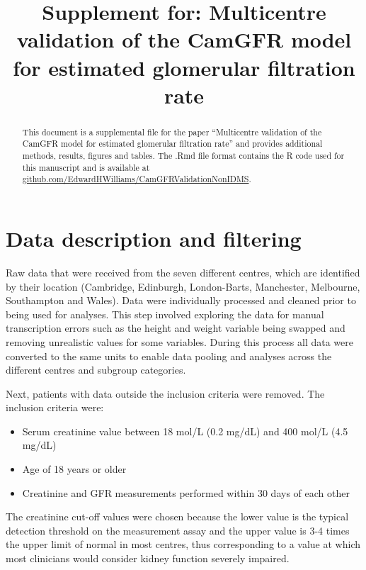 \documentclass[11pt,]{article}
\title{Supplement for: Multicentre validation of the CamGFR model for estimated
glomerular filtration rate}
\author{}
\date{}
\newcommand{\beginsupplement}{\setcounter{table}{0} \renewcommand{\thetable}{S\arabic{table}} \setcounter{figure}{0} \renewcommand{\thefigure}{S\arabic{figure}}} \usepackage{breqn} \usepackage{biblatex} \usepackage{graphicx} \usepackage{textgreek}
\begin{document}
\maketitle
\begin{abstract}
This document is a supplemental file for the paper ``Multicentre
validation of the CamGFR model for estimated glomerular filtration
rate'' and provides additional methods, results, figures and tables. The
.Rmd file format contains the R code used for this manuscript and is
available at
\href{https://github.com/EdwardHWilliams/CamGFRValidationNonIDMS}{github.com/EdwardHWilliams/CamGFRValidationNonIDMS}.
\end{abstract}

\beginsupplement

\section{Data description and
filtering}\label{data-description-and-filtering}

Raw data that were received from the seven different centres, which are
identified by their location (Cambridge, Edinburgh, London-Barts,
Manchester, Melbourne, Southampton and Wales). Data were individually
processed and cleaned prior to being used for analyses. This step
involved exploring the data for manual transcription errors such as the
height and weight variable being swapped and removing unrealistic values
for some variables. During this process all data were converted to the
same units to enable data pooling and analyses across the different
centres and subgroup categories.

Next, patients with data outside the inclusion criteria were removed.
The inclusion criteria were:

\begin{itemize}
\item Serum creatinine value between 18 \textmu mol/L (0.2 mg/dL) and 400 \textmu mol/L (4.5 mg/dL)
\item Age of 18 years or older
\item Creatinine and GFR measurements performed within 30 days of each other 
\end{itemize}

The creatinine cut-off values were chosen because the lower value is the
typical detection threshold on the measurement assay and the upper value
is 3-4 times the upper limit of normal in most centres, thus
corresponding to a value at which most clinicians would consider kidney
function severely impaired.
\end{document}
